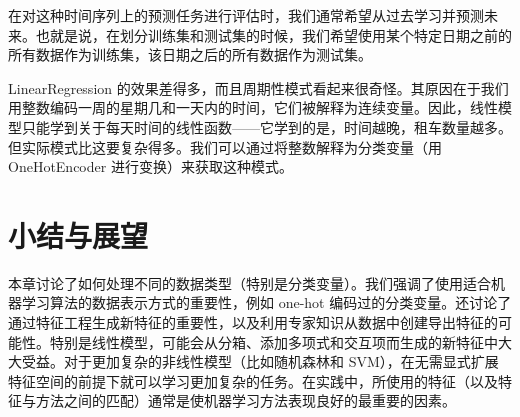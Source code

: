 在对这种时间序列上的预测任务进行评估时，我们通常希望从过去学习并预测未来。也就是说，在划分训练集和测试集的时候，我们希望使用某个特定日期之前的所有数据作为训练集，该日期之后的所有数据作为测试集。

LinearRegression 的效果差得多，而且周期性模式看起来很奇怪。其原因在于我们用整数编码一周的星期几和一天内的时间，它们被解释为连续变量。因此，线性模型只能学到关于每天时间的线性函数——它学到的是，时间越晚，租车数量越多。但实际模式比这要复杂得多。我们可以通过将整数解释为分类变量（用 OneHotEncoder 进行变换）来获取这种模式。
\section{小结与展望}
本章讨论了如何处理不同的数据类型（特别是分类变量）。我们强调了使用适合机器学习算法的数据表示方式的重要性，例如 one-hot 编码过的分类变量。还讨论了通过特征工程生成新特征的重要性，以及利用专家知识从数据中创建导出特征的可能性。特别是线性模型，可能会从分箱、添加多项式和交互项而生成的新特征中大大受益。对于更加复杂的非线性模型（比如随机森林和 SVM），在无需显式扩展特征空间的前提下就可以学习更加复杂的任务。在实践中，所使用的特征（以及特征与方法之间的匹配）通常是使机器学习方法表现良好的最重要的因素。